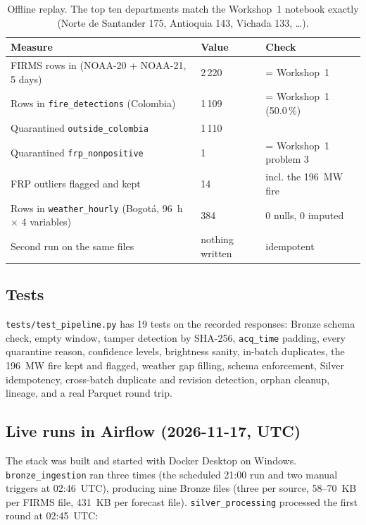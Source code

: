 \documentclass[11pt,a4paper]{article}
\newcommand{\code}[1]{\texttt{\small #1}}
\begin{document}
\begin{table}[H]
\centering
\small
\begin{tabular}{L{6.2cm}R{2.4cm}L{5.6cm}}
\toprule
\textbf{Measure} & \textbf{Value} & \textbf{Check} \\
\midrule
FIRMS rows in (NOAA-20 + NOAA-21, 5 days) & 2\,220 & = Workshop~1 \\
Rows in \code{fire\_detections} (Colombia) & 1\,109 & = Workshop~1 (50.0\,\%) \\
Quarantined \code{outside\_colombia} & 1\,110 & \\
Quarantined \code{frp\_nonpositive} & 1 & = Workshop~1 problem 3 \\
FRP outliers flagged and kept & 14 & incl. the 196~MW fire \\
Rows in \code{weather\_hourly} (Bogotá, 96~h $\times$ 4 variables) & 384 & 0 nulls, 0 imputed \\
Second run on the same files & nothing written & idempotent \\
\bottomrule
\end{tabular}
\caption{Offline replay. The top ten departments match the Workshop~1 notebook exactly
(Norte de Santander 175, Antioquia 143, Vichada 133, \ldots).}
\end{table}

\subsection{Tests}

\code{tests/test\_pipeline.py} has 19 tests on the recorded responses: Bronze schema check, empty
window, tamper detection by SHA-256, \code{acq\_time} padding, every quarantine reason, confidence
levels, brightness sanity, in-batch duplicates, the 196~MW fire kept and flagged, weather gap filling,
schema enforcement, Silver idempotency, cross-batch duplicate and revision detection, orphan cleanup,
lineage, and a real Parquet round trip.

\subsection{Live runs in Airflow (2026-11-17, UTC)}

The stack was built and started with Docker Desktop on Windows. \code{bronze\_ingestion} ran three
times (the scheduled 21:00 run and two manual triggers at 02:46~UTC), producing nine Bronze files
(three per source, 58--70~KB per FIRMS file, 431~KB per forecast file). \code{silver\_processing}
processed the first round at 02:45~UTC:
\end{document}
